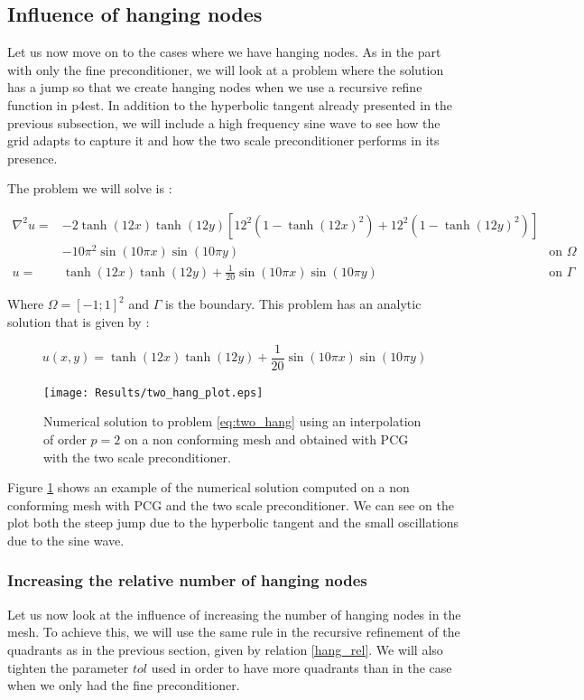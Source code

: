 \subsection{Influence of hanging nodes}

Let us now move on to the cases where we have hanging nodes. As in the part with only the fine preconditioner, we will look at a problem where the solution has a jump so that we create hanging nodes when we use a recursive refine function in p4est. In addition to the hyperbolic tangent already presented in the previous subsection, we will include a high frequency sine wave to see how the grid adapts to capture it and how the two scale preconditioner performs in its presence. 

The problem we will solve is : 

\begin{align}
\nabla^2 u =& -2\tanh(12x)\tanh(12y)\left[ 12^2(1-\tanh(12x)^2) + 12^2(1-\tanh(12y)^2)\right] \nonumber \\
 &-  10\pi^2\sin(10\pi x)\sin(10\pi y) &\text{on $\Omega$} \label{eq:two_hang}\\
u =&   \tanh(12x)\tanh(12y) + \frac{1}{20}\sin(10\pi x)\sin(10\pi y)&\text{on $\Gamma$}
\end{align}

Where $\Omega = [-1;1]^2$ and $\Gamma$ is the boundary. This problem has an analytic solution that is given by : 

$$u(x,y) = \tanh(12x)\tanh(12y) + \frac{1}{20}\sin(10\pi x)\sin(10\pi y)$$

\begin{figure}
\centering
\texttt{[image: Results/two\_hang\_plot.eps]}
\caption{Numerical solution to problem \ref{eq:two_hang} using an interpolation of order $p=2$ on a non conforming mesh and obtained with PCG with the two scale preconditioner.}
\label{two_hang_plot}
\end{figure}

Figure \ref{two_hang_plot} shows an example of the numerical solution computed on a non conforming mesh with PCG and the two scale preconditioner. We can see on the plot both the steep jump due to the hyperbolic tangent and the small oscillations due to the sine wave.

\subsubsection{Increasing the relative number of hanging nodes}

Let us now look at the influence of increasing the number of hanging nodes in the mesh. To achieve this, we will use the same rule in the recursive refinement of the quadrants as in the previous section, given by relation \ref{hang_rel}. We will also tighten the parameter $tol$ used in order to have more quadrants than in the case when we only had the fine preconditioner. 

